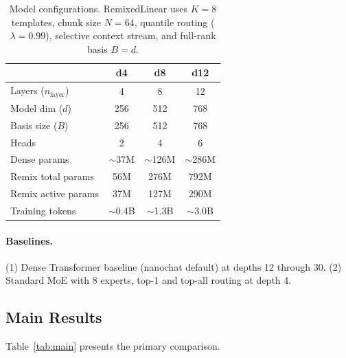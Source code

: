 \documentclass[11pt]{article}
\begin{document}
\begin{table}[t]
\centering
\small
\caption{Model configurations. RemixedLinear uses $K{=}8$ templates, chunk size $N{=}64$, quantile routing ($\lambda{=}0.99$), selective context stream, and full-rank basis $B{=}d$.}
\label{tab:configs}
\begin{tabular}{@{}lccc@{}}
\toprule
& \textbf{d4} & \textbf{d8} & \textbf{d12} \\
\midrule
Layers ($n_\text{layer}$) & 4 & 8 & 12 \\
Model dim ($d$) & 256 & 512 & 768 \\
Basis size ($B$) & 256 & 512 & 768 \\
Heads & 2 & 4 & 6 \\
Dense params & $\sim$37M & $\sim$126M & $\sim$286M \\
Remix total params & 56M & 276M & 792M \\
Remix active params & 37M & 127M & 290M \\
Training tokens & $\sim$0.4B & $\sim$1.3B & $\sim$3.0B \\
\bottomrule
\end{tabular}
\end{table}

\paragraph{Baselines.} (1) Dense Transformer baseline (nanochat default) at depths 12 through 30. (2) Standard MoE with 8 experts, top-1 and top-all routing at depth 4.

\subsection{Main Results}

Table~\ref{tab:main} presents the primary comparison.
\end{document}
